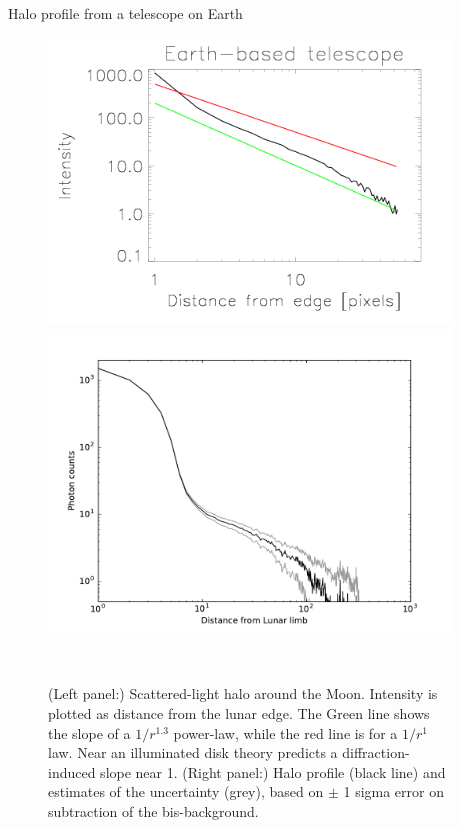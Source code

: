 \documentclass[final,hyperref={pdfpagelabels=false}]{beamer}
\begin{document}
\begin{frame}[t]
\begin{columns}[t]
\begin{column}{.01\textwidth}\end{column} %
\begin{column}{.23\textwidth}
\begin{block}{Halo profile from a telescope on Earth}
\begin{figure}
\centering 
\includegraphics[scale=.6]{fig/MLOprofile.png}
\includegraphics[scale=.6]{fig/fl-moon.pdf}
\caption{ (Left panel:) Scattered-light halo around the Moon. Intensity is plotted as distance from the lunar edge. The Green line shows the slope of a $1/r^{1.3}$ power-law, while the red line is for a $1/r^{1}$ law. Near an illuminated disk theory predicts a diffraction-induced slope near 1. (Right panel:) Halo profile (black line) and estimates of the uncertainty (grey), based on $\pm$ 1 sigma error on subtraction of the bis-background.}~\label{fig:MLOresult}
\end{figure}


\end{block}
\end{column}
\end{columns}
\end{frame}
\end{document}

